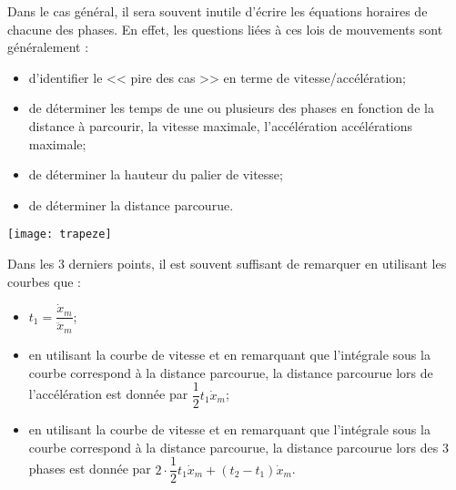 Dans le cas général, il sera souvent inutile d'écrire les équations horaires de chacune des phases. En effet, les questions liées à ces lois de mouvements sont généralement :
\begin{itemize}
\item d'identifier le << pire des cas >> en terme de vitesse/accélération;
\item de déterminer les temps de une ou plusieurs des phases en fonction de la distance à parcourir, la vitesse maximale, l'accélération accélérations maximale;
\item de déterminer la hauteur du palier de vitesse;
\item de déterminer la distance parcourue. 
\end{itemize}


\begin{marginfigure}
\texttt{[image: trapeze]}
\end{marginfigure}


\begin{resultat}
Dans les 3 derniers points, il est souvent suffisant de remarquer en utilisant les courbes que : 
\begin{itemize}
\item $t_1=\dfrac{\dot{x}_m}{\ddot{x}_m}$;
\item en utilisant la courbe de vitesse et en remarquant que l'intégrale sous la courbe correspond à la distance parcourue, la distance parcourue lors de l'accélération est donnée par $\dfrac{1}{2}t_1\dot{x}_m$;
\item en utilisant la courbe de vitesse et en remarquant que l'intégrale sous la courbe correspond à la distance parcourue, la distance parcourue lors des 3 phases est donnée par $2\cdot \dfrac{1}{2}t_1\dot{x}_m+\left(t_2-t_1\right)\dot{x}_m$.
\end{itemize}
\end{resultat}


